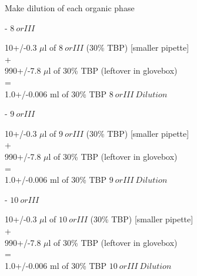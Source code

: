 \documentclass[idxtotoc,hyperref,openany,oneside]{labbook} %
\newcommand{\cmark}{\ding{51}}%
\newcommand{\done}{\rlap{$\square$}{\raisebox{2pt}{\large\hspace{1pt}\cmark}}%
  \hspace{-2.5pt}}
\begin{document}
\begin{todolist}
\item[\done]{Make dilution of each organic phase}
  \begin{todolist}
  \item[\done]{- $\boxed{8\ orIII}$}
  \end{todolist}
  \begin{center}
    10+/-0.3 $\mu$l of $\boxed{8\ orIII}$
    (30\% TBP) [smaller pipette]\\
    +\\
    990+/-7.8 $\mu$l of 30\% TBP (leftover in glovebox)\\
    =\\
    1.0+/-0.006 ml of 30\% TBP $\boxed{8\ orIII\ Dilution}$
  \end{center}
  \begin{todolist}
  \item[\done]{- $\boxed{9\ orIII}$}
  \end{todolist}
  \begin{center}
    10+/-0.3 $\mu$l of $\boxed{9\ orIII}$
    (30\% TBP) [smaller pipette]\\
    +\\
    990+/-7.8 $\mu$l of 30\% TBP (leftover in glovebox)\\
    =\\
    1.0+/-0.006 ml of 30\% TBP $\boxed{9\ orIII\ Dilution}$
  \end{center}
  \begin{todolist}
  \item[\done]{- $\boxed{10\ orIII}$}
  \end{todolist}
  \begin{center}
    10+/-0.3 $\mu$l of $\boxed{10\ orIII}$
    (30\% TBP) [smaller pipette]\\
    +\\
    990+/-7.8 $\mu$l of 30\% TBP (leftover in glovebox)\\
    =\\
    1.0+/-0.006 ml of 30\% TBP $\boxed{10\ orIII\ Dilution}$
  \end{center}
 

\end{todolist}
\end{document}
